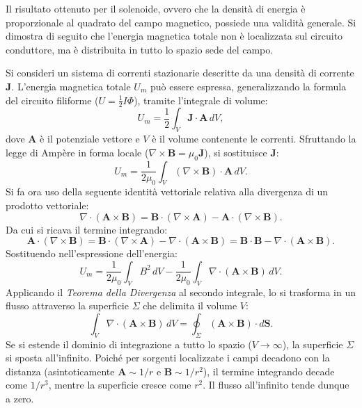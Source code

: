 \documentclass[a4paper,11pt]{report}
\begin{document}
\begin{approfondimento}[colback=white, colframe=blue!60, no shadow, title=Generalizzazione: l'energia del campo magnetico]

Il risultato ottenuto per il solenoide, ovvero che la densità di energia è proporzionale al quadrato del campo magnetico, possiede una validità generale. Si dimostra di seguito che l'energia magnetica totale non è localizzata sul circuito conduttore, ma è distribuita in tutto lo spazio sede del campo.

Si consideri un sistema di correnti stazionarie descritte da una densità di corrente $\bm{J}$. L'energia magnetica totale $U_m$ può essere espressa, generalizzando la formula del circuito filiforme ($U = \frac{1}{2}I\Phi$), tramite l'integrale di volume:
\begin{equation}
U_m = \frac{1}{2} \int_V \bm{J} \cdot \bm{A} \, dV,
\end{equation}
dove $\bm{A}$ è il potenziale vettore e $V$ è il volume contenente le correnti.
Sfruttando la legge di Ampère in forma locale ($\nabla \times \bm{B} = \mu_0 \bm{J}$), si sostituisce $\bm{J}$:
\begin{equation}
U_m = \frac{1}{2\mu_0} \int_V (\nabla \times \bm{B}) \cdot \bm{A} \, dV.
\end{equation}
Si fa ora uso della seguente identità vettoriale relativa alla divergenza di un prodotto vettoriale:
\begin{equation}
\nabla \cdot (\bm{A} \times \bm{B}) = \bm{B} \cdot (\nabla \times \bm{A}) - \bm{A} \cdot (\nabla \times \bm{B}).
\end{equation}
Da cui si ricava il termine integrando:
\begin{equation}
\bm{A} \cdot (\nabla \times \bm{B}) = \bm{B} \cdot (\nabla \times \bm{A}) - \nabla \cdot (\bm{A} \times \bm{B}) = \bm{B} \cdot \bm{B} - \nabla \cdot (\bm{A} \times \bm{B}).
\end{equation}
Sostituendo nell'espressione dell'energia:
\begin{equation}
U_m = \frac{1}{2\mu_0} \int_V B^2 \, dV - \frac{1}{2\mu_0} \int_V \nabla \cdot (\bm{A} \times \bm{B}) \, dV.
\end{equation}
Applicando il \textit{Teorema della Divergenza} al secondo integrale, lo si trasforma in un flusso attraverso la superficie $\Sigma$ che delimita il volume $V$:
\begin{equation}
\int_V \nabla \cdot (\bm{A} \times \bm{B}) \, dV = \oint_\Sigma (\bm{A} \times \bm{B}) \cdot d\bm{S}.
\end{equation}
Se si estende il dominio di integrazione a tutto lo spazio ($V \to \infty$), la superficie $\Sigma$ si sposta all'infinito. Poiché per sorgenti localizzate i campi decadono con la distanza (asintoticamente $\bm{A} \sim 1/r$ e $\bm{B} \sim 1/r^2$), il termine integrando decade come $1/r^3$, mentre la superficie cresce come $r^2$. Il flusso all'infinito tende dunque a zero.


\end{approfondimento}
\end{document}
